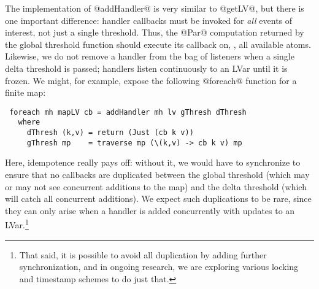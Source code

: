The implementation of @addHandler@ is very similar to @getLV@, but there is one
important difference: handler callbacks must be invoked for \emph{all} events of
interest, not just a single threshold.  Thus, the @Par@ computation returned by
the global threshold function should execute its callback on, \eg, all available
atoms.  Likewise, we do not remove a handler from the bag of listeners when a
single delta threshold is passed; handlers listen continuously to an LVar until
it is frozen.  We might, for example, expose the following @foreach@ function
for a finite map:
\begin{lstlisting}
 foreach mh mapLV cb = addHandler mh lv gThresh dThresh
   where
     dThresh (k,v) = return (Just (cb k v))
     gThresh mp    = traverse mp (\(k,v) -> cb k v) mp
\end{lstlisting}
Here, idempotence really pays off: without it, we would have to synchronize to
ensure that no callbacks are duplicated between the global threshold (which may
or may not see concurrent additions to the map) and the delta threshold (which
will catch all concurrent additions).  We expect such duplications to be rare,
since they can only arise when a handler is added concurrently with updates to
an LVar.\footnote{That said, it is possible to avoid all duplication by adding
  further synchronization, and in ongoing research, we are exploring various
  locking and timestamp schemes to do just that.}







